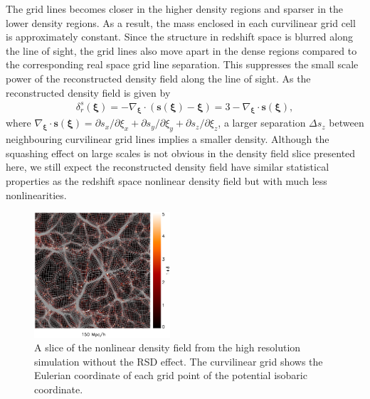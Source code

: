 \documentclass[aps,prd,twocolumn,superscriptaddress,groupedaddress,nofootinbib,amsfont]{revtex4}  %
\newcommand{\bea}{\begin{eqnarray}}
\newcommand{\eea}{\end{eqnarray}}
\newcommand{\bms}{\bm{s}}
\newcommand{\bmxi}{\bm{\xi}}
\begin{document}
The grid lines becomes closer in the higher density regions and sparser in the 
lower density regions. As a result, the mass enclosed in each curvilinear grid 
cell is approximately constant. Since the structure in redshift
space is blurred along the line of sight, the grid lines also move apart in the
dense regions compared to the corresponding real space grid line separation.
This suppresses the small scale power of the reconstructed density field 
along the line of sight.
As the reconstructed density field is given by 
\bea
\delta_r^s(\bmxi)=-\nabla_{\bmxi}\cdot(\bms(\bmxi)-\bmxi)=3-\nabla_{\bmxi}\cdot\bms(\bmxi),
\eea
where $\nabla_{\bmxi}\cdot\bms(\bmxi)=\partial s_x/\partial\xi_x+\partial s_y/\partial\xi_y+\partial s_z/\partial\xi_z$, a larger separation $\Delta s_z$ 
between neighbouring curvilinear grid lines implies a smaller density.
Although the squashing effect on large scales is not obvious in the density
field slice presented here, we still expect the reconstructed density field 
have similar statistical properties as the redshift space nonlinear density 
field but with much less nonlinearities.

\begin{figure}[tbp]
\begin{center}
\includegraphics[width=0.45\textwidth]{map0512-0128_i1500_xz222.eps}
\end{center}
\vspace{-0.7cm}
\caption{A slice of the nonlinear density field from the high resolution 
    simulation without the RSD effect. The curvilinear grid shows the Eulerian
    coordinate of each grid point of the potential isobaric coordinate.}
\label{fig:map}
\end{figure}
\end{document}
